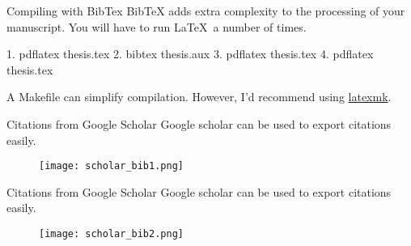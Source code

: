 \begin{frame}{Compiling with BibTex}
  BibTeX adds extra complexity to the processing of your manuscript. You will
  have to run \LaTeX\ a number of times.

  \alert{1.} pdflatex thesis.tex
  \alert{2.} bibtex thesis.\alert{aux}
  \alert{3.} pdflatex thesis.tex
  \alert{4.} pdflatex thesis.tex

  A Makefile can simplify compilation. However, I'd recommend using
  \href{https://ctan.org/pkg/latexmk?lang=en}{latexmk}.
\end{frame}

\begin{frame}{Citations from Google Scholar}
  Google scholar can be used to export citations easily.
  \begin{figure}
    \centering
    \texttt{[image: scholar\_bib1.png]}
  \end{figure}
\end{frame}

\begin{frame}{Citations from Google Scholar}
Google scholar can be used to export citations easily.
  \begin{figure}
    \centering
    \texttt{[image: scholar\_bib2.png]}
  \end{figure}
\end{frame}


